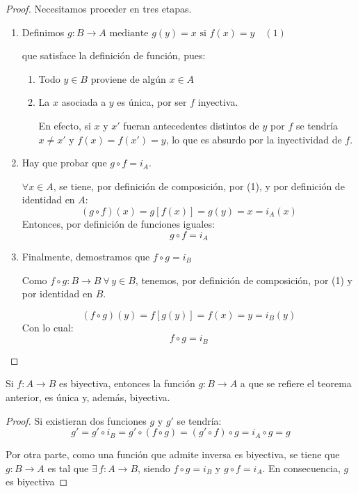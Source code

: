 \begin{enumerate}
	\begin{proof}
		Necesitamos proceder en tres etapas.
		
		\begin{enumerate}[label=\textbf{\alph*)}]
			\item Definimos
			$g: B \rightarrow A \mbox{ mediante } g(y)= x \mbox{ si } f(x) = y
			\quad (1)$
			
			que satisface la definición de función, pues:
			\begin{enumerate}[label=\roman*), ref=\roman*]
				\item Todo $y \in B$ proviene de algún $x \in A$
				\item La $x$ asociada a $y$ es única, por ser $f$ inyectiva.
				
				En efecto, si $x$ y $x'$ fueran antecedentes distintos de $y$ por $f$
				se tendría $x \ne x'$ y $f(x) = f(x') = y$, lo que es absurdo por la
				inyectividad de $f$.
			\end{enumerate}
		\item Hay que probar que $g \circ f = i_A$.
		
		$\forall x \in A$, se tiene, por definición de composición, por (1), y
		por definición de identidad en $A$:
		\[ (g \circ  f)(x) = g[f(x)] = g(y) = x = i_A(x)\]
		Entonces, por definición de funciones iguales:
		\[ g \circ f = i_A \]

		\item Finalmente, demostramos que $f \circ g = i_B$
		
		Como $f \circ g: B \rightarrow B \ \forall \, y \in B$, tenemos, por definición
		de composición, por (1) y por identidad en $B$.
		
		\[ (f \circ g)(y) = f[g(y)] = f(x) = y = i_B(y) \]
		Con lo cual:
		\[ f \circ g = i_B \]
	\end{enumerate}
\end{proof}
\end{enumerate}

\begin{mdframed}[backgroundcolor=gray!20, linecolor=black, linewidth=1pt,
	frametitle={Consecuencia}]
	Si $f: A \rightarrow B$ es biyectiva, entonces la función $g:B \rightarrow A$ a 
	que se refiere el teorema anterior, es única y, además, biyectiva.
\end{mdframed}
\begin{proof}
	Si existieran dos funciones $g$ y $g'$ se tendría:
	\[ g' = g' \circ i_B = g' \circ (f \circ g) = (g' \circ f) \circ g = 
	i_A \circ g = g \]
	
	Por otra parte, como una función que admite inversa es biyectiva, se tiene 
	que $g: B \rightarrow A$ es tal que $\exists \, f: A \rightarrow B$, siendo
	$f \circ g = i_B$ y $g \circ f = i_A$. En consecuencia, $g$ es biyectiva
\end{proof}


